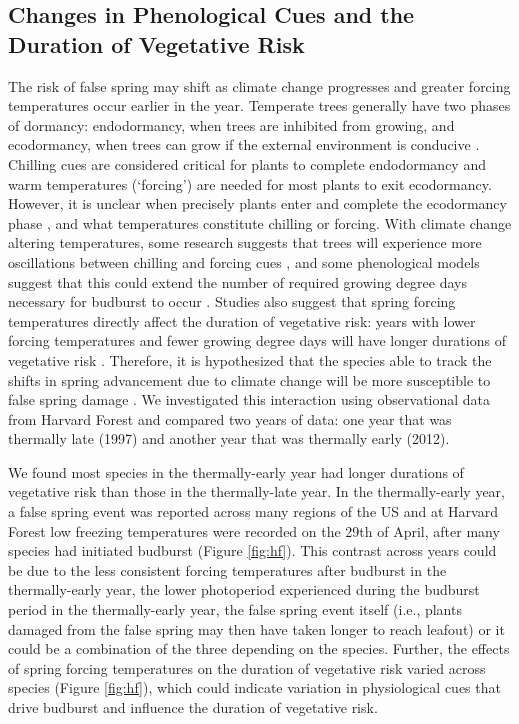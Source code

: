 \documentclass{article}\usepackage[]{graphicx}\usepackage[]{color}
\begin{document}
\subsection{Changes in Phenological Cues and the Duration of Vegetative Risk}
The risk of false spring may shift as climate change progresses and greater forcing temperatures occur earlier in the year. Temperate trees generally have two phases of dormancy: endodormancy, when trees are inhibited from growing, and ecodormancy, when trees can grow if the external environment is conducive \citep{Basler2012}. Chilling cues are considered critical for plants to complete endodormancy and warm temperatures (`forcing') are needed for most plants to exit ecodormancy. However, it is unclear when precisely plants enter and complete the ecodormancy phase \citep{Chuine2016}, and what temperatures constitute chilling or forcing. With climate change altering temperatures, some research suggests that trees will experience more oscillations between chilling and forcing cues \citep{Martin2010}, and some phenological models suggest that this could extend the number of required growing degree days necessary for budburst to occur \citep{Vitasse2011}. Studies also suggest that spring forcing temperatures directly affect the duration of vegetative risk: years with lower forcing temperatures and fewer growing degree days will have longer durations of vegetative risk \citep{Donnelly2017}. Therefore, it is hypothesized that the species able to track the shifts in spring advancement due to climate change will be more susceptible to false spring damage \citep{Scheifinger2003}. We investigated this interaction using observational data from Harvard Forest \citep{Okeefe2014} and compared two years of data: one year that was thermally late (1997) and another year that was thermally early (2012).

We found most species in the thermally-early year had longer durations of vegetative risk than those in the thermally-late year. In the thermally-early year, a false spring event was reported across many regions of the US and at Harvard Forest low freezing temperatures were recorded on the 29th of April, after many species had initiated budburst (Figure \ref{fig:hf}). This contrast across years could be due to the less consistent forcing temperatures after budburst in the thermally-early year, the lower photoperiod experienced during the budburst period in the thermally-early year, the false spring event itself (i.e., plants damaged from the false spring may then have taken longer to reach leafout) or it could be a combination of the three depending on the species. Further, the effects of spring forcing temperatures on the duration of vegetative risk varied across species (Figure \ref{fig:hf}), which could indicate variation in physiological cues that drive budburst and influence the duration of vegetative risk.
\end{document}
